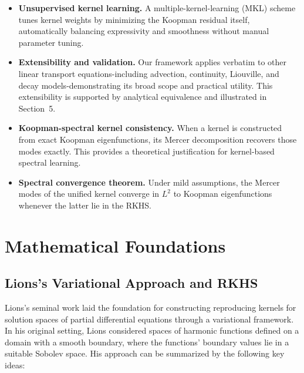 \documentclass[11pt]{article}
\theoremstyle{plain}
\begin{document}
\begin{itemize}
  \item \textbf{Unsupervised kernel learning.} A multiple-kernel-learning (MKL) scheme tunes kernel weights
        by minimizing the Koopman residual itself, automatically balancing expressivity and smoothness
        without manual parameter tuning.


  \item \textbf{Extensibility and validation.} Our framework applies verbatim to other linear transport equations-including advection, continuity, Liouville, and decay models-demonstrating its broad scope and practical utility. This extensibility is supported by analytical equivalence and illustrated in Section~5.

\item \textbf{Koopman-spectral kernel consistency.} When a kernel is constructed from exact Koopman eigenfunctions, its Mercer decomposition recovers those modes exactly. This provides a theoretical justification for kernel-based spectral learning.
\item \textbf{Spectral convergence theorem.} Under mild assumptions, the Mercer modes of the unified kernel converge in \(L^2\) to Koopman eigenfunctions whenever the latter lie in the RKHS.


\end{itemize}

 

\section{Mathematical Foundations}

\subsection{Lions’s Variational Approach and RKHS}
Lions’s seminal work laid the foundation for constructing reproducing kernels for solution spaces of partial differential equations through a variational framework. In his original setting, Lions considered spaces of harmonic functions defined on a domain with a smooth boundary, where the functions’ boundary values lie in a suitable Sobolev space. His approach can be summarized by the following key ideas:
\end{document}
